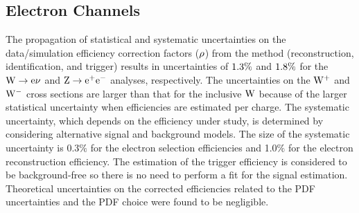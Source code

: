 
\subsection{Electron Channels}
\label{subsec:ELEsystematics}

\par
The propagation of statistical and systematic uncertainties on the data/simulation
efficiency correction factors ($\rho$)
from the \TNP method (reconstruction, identification, and trigger)
results in uncertainties of $ 1.3  \%$ and $ 1.8  \%$ for the $\mathrm{W} \rightarrow \mathrm{e}\nu$ and $\mathrm{Z} \rightarrow \mathrm{e}^+\mathrm{e}^-$ analyses,
respectively. The uncertainties on the $\mathrm{W^+}$ and $\mathrm{W^-}$ cross sections are larger than that for
the inclusive $\mathrm{W}$ because of the larger statistical uncertainty when efficiencies are estimated
per charge. The systematic uncertainty, which depends on the efficiency
under study, is determined by considering alternative signal and background models. 
The size of the systematic uncertainty is 0.3$\%$ for the electron selection efficiencies 
and 1.0$\%$ for the electron reconstruction efficiency. The estimation of the 
trigger efficiency is considered to be background-free so there is no need to 
perform a fit for the signal estimation. Theoretical uncertainties on the 
corrected efficiencies related to the PDF uncertainties and the PDF choice were 
found to be negligible.

